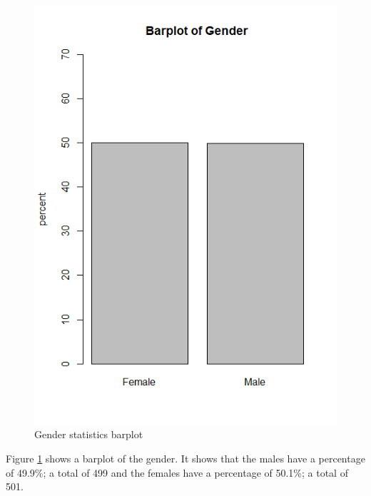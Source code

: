 \begin{figure}[H]
	\centering
	\includegraphics[width=0.5\linewidth]{screenshot006}
	\caption{Gender statistics barplot}
	\label{fig:genderbar}
\end{figure}
Figure \ref{fig:genderbar} shows a barplot of the gender. It shows that the males have a percentage of 49.9\%; a total of 499 and the females have a percentage of 50.1\%; a total of 501.
